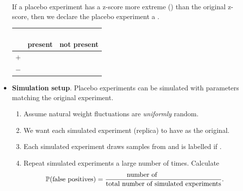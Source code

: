 \documentclass[../main.tex]{subfiles}
\begin{document}
\begin{example}
\begin{itemize}[wide]
      \bigskip

      \begin{minipage}{3in}
        \setlength{\baselineskip}{20pt}
        \faStar{} If a placebo experiment has a z-score more extreme  (\underline{\hspace{1in}}) than the original z-score, then we declare the placebo experiment a \underline{\hspace{2in}}.
      \end{minipage}
      \begin{minipage}{4in}
        \centering
        \begin{tabular}{c||c|c}
      & \parbox{1.25in}{\centering \phantom{condition}\\present} & \parbox{1.25in}{\centering \phantom{condition}\\not present} \\\midrule\midrule
          \(+\) &                                             & \\[3ex]\midrule
          \(-\) &                                             & \\[3ex]
        \end{tabular}
      \end{minipage}


      \clearpage
    \item \textbf{Simulation setup}. Placebo experiments can be simulated with parameters matching the original experiment.

      \begin{enumerate}
        \item Assume natural weight fluctuations are \emph{uniformly} random.


        \item We want each simulated experiment (replica) to have  as the original.


        \item Each simulated experiment draws \underline{\hspace{2cm}} samples from \underline{\hspace{1in}} and is labelled \underline{\hspace{2in}} if \underline{\hspace{2in}}.


        \item Repeat simulated experiments a large number of times. Calculate 
          \[
            \mathbb{P}(\text{false positives}) = \frac{\text{number of \phantom{false positives}}}{\text{total number of simulated experiments}}.
          \]
      \end{enumerate}


\end{itemize}
\end{example}
\end{document}
